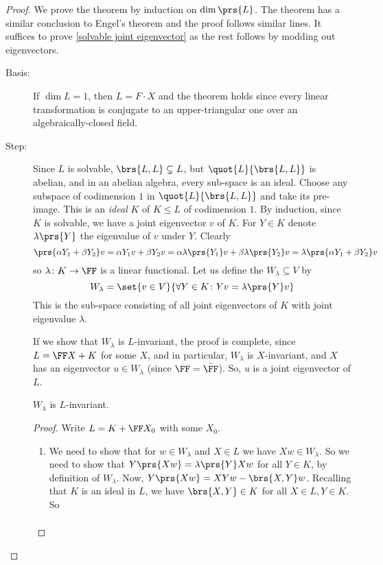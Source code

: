 \documentclass[10pt,a4paper,twoside,openany,hidelinks]{book}
\begin{document}
\begin{proof}
We prove the theorem by induction on $\dim \prs{L}$. The theorem has a similar conclusion to Engel's theorem and the proof follows similar lines. It suffices to prove \ref{solvable joint eigenvector} as the rest follows by modding out eigenvectors.
\begin{description}
\item[Basis:] If $\dim L = 1$, then $L = F\cdot X$ and the theorem holds since every linear transformation is conjugate to an upper-triangular one over an algebraically-closed field.
\item[Step:] Since $L$ is solvable, $\brs{L,L} \subsetneq L$, but $\quot{L}{\brs{L,L}}$ is abelian, and in an abelian algebra, every sub-space is an ideal. Choose any subspace of codimension $1$ in $\quot{L}{\brs{L,L}}$ and take its pre-image. This is an \emph{ideal} $K$ of $K \leq L$ of codimension $1$.
By induction, since $K$ is solvable, we have a joint eigenvector $v$ of $K$. For $Y \in K$ denote $\lambda\prs{Y}$ the eigenvalue of $v$ under $Y$. Clearly \[\prs{\alpha Y_1 + \beta Y_2} v = \alpha Y_1 v + \beta Y_2 v = \alpha \lambda\prs{Y_1}v + \beta \lambda\prs{Y_2} v = \lambda\prs{\alpha Y_1 + \beta Y_2}v\] so $\lambda \colon K \to \FF$ is a linear functional.
Let us define the  $W_{\lambda} \subseteq V$ by
\[W_{\lambda} = \set{v \in V}{\forall Y \in K \colon Yv = \lambda\prs{Y}v}\]
This is the sub-space consisting of all joint eigenvectors of $K$ with joint eigenvalue $\lambda$.
\begin{note}
If we show that $W_{\lambda}$ is $L$-invariant, the proof is complete, since $L = \FF X + K$ for some $X$, and in particular, $W_{\lambda}$ is $X$-invariant, and $X$ has an eigenvector $u \in W_{\lambda}$ (since $\FF = \bar{\FF}$). So, $u$ is a joint eigenvector of $L$.
\end{note}
\begin{lemma}
$W_{\lambda}$ is $L$-invariant.
\end{lemma}
\begin{proof}
Write $L = K + \FF X_0$ with some $X_0$.
\begin{enumerate}[label = \Roman*)]
\item We need to show that for $w \in W_{\lambda}$ and $X \in L$ we have $Xw \in W_{\lambda}$. So we need to show that $Y\prs{Xw} = \lambda\prs{Y} Xw$ for all $Y \in K$, by definition of $W_{\lambda}$.
Now, $Y\prs{Xw} = XYw - \brs{X,Y}w$. Recalling that $K$ is an ideal in $L$, we have $\brs{X,Y} \in K$ for all $X\in L, Y\in K$. So \begin{align*}

\end{align*}
\end{enumerate}
\end{proof}
\end{description}
\end{proof}
\end{document}
